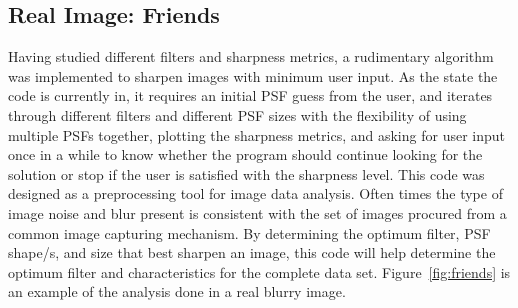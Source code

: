 \subsection{Real Image: Friends}
Having studied different filters and sharpness metrics, a rudimentary algorithm was implemented to sharpen images with minimum user input. As the state the code is currently in, it requires an initial PSF guess from the user, and iterates through different filters and different PSF sizes with the flexibility of using multiple PSFs together, plotting the sharpness metrics, and asking for user input once in a while to know whether the program should continue looking for the solution or stop if the user is satisfied with the sharpness level. This code was designed as a preprocessing tool for image data analysis. Often times the type of image noise and blur present is consistent with the set of images procured from a common image capturing mechanism. By determining the optimum filter, PSF shape/s, and size that best sharpen an image, this code will help determine the optimum filter and characteristics for the complete data set. Figure~\ref{fig:friends} is an example of the analysis done in a real blurry image.

